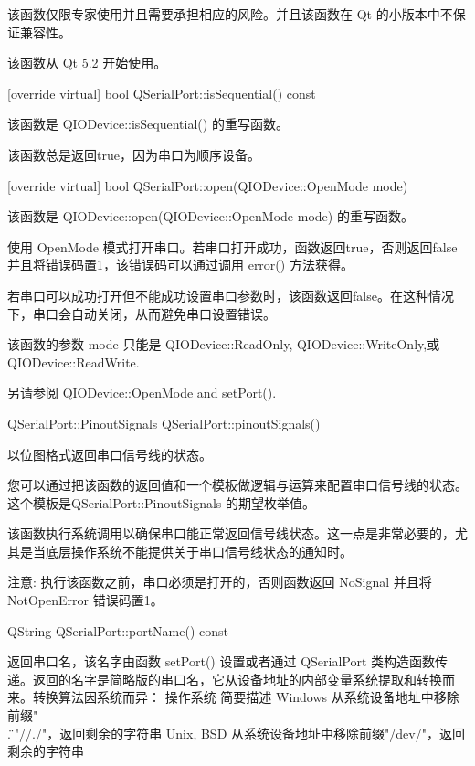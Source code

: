 \begin{warning}
该函数仅限专家使用并且需要承担相应的风险。并且该函数在 Qt 的小版本中不保证兼容性。
\end{warning}

该函数从 Qt 5.2 开始使用。

[override virtual] bool QSerialPort::isSequential() const

该函数是 QIODevice::isSequential() 的重写函数。

该函数总是返回true，因为串口为顺序设备。

[override virtual] bool QSerialPort::open(QIODevice::OpenMode mode)

该函数是 QIODevice::open(QIODevice::OpenMode mode) 的重写函数。

使用 OpenMode 模式打开串口。若串口打开成功，函数返回true，否则返回false并且将错误码置1，该错误码可以通过调用 error() 方法获得。

\begin{notice}
若串口可以成功打开但不能成功设置串口参数时，该函数返回false。在这种情况下，串口会自动关闭，从而避免串口设置错误。
\end{notice}

\begin{warning}
该函数的参数 mode 只能是 QIODevice::ReadOnly, QIODevice::WriteOnly,或 QIODevice::ReadWrite.
\end{warning}

\begin{seeAlso}
另请参阅 QIODevice::OpenMode and setPort().
\end{seeAlso}

QSerialPort::PinoutSignals QSerialPort::pinoutSignals()

以位图格式返回串口信号线的状态。

您可以通过把该函数的返回值和一个模板做逻辑与运算来配置串口信号线的状态。这个模板是QSerialPort::PinoutSignals 的期望枚举值。

\begin{notice}
该函数执行系统调用以确保串口能正常返回信号线状态。这一点是非常必要的，尤其是当底层操作系统不能提供关于串口信号线状态的通知时。
\end{notice}

\begin{notice}
注意: 执行该函数之前，串口必须是打开的，否则函数返回 NoSignal 并且将 NotOpenError 错误码置1。
\end{notice}

QString QSerialPort::portName() const

返回串口名，该名字由函数 setPort() 设置或者通过 QSerialPort 类构造函数传递。返回的名字是简略版的串口名，它从设备地址的内部变量系统提取和转换而来。转换算法因系统而异：
操作系统 	简要描述
Windows 	从系统设备地址中移除前缀"\\.\"或"//./"，返回剩余的字符串
Unix, BSD 	从系统设备地址中移除前缀"/dev/"，返回剩余的字符串

